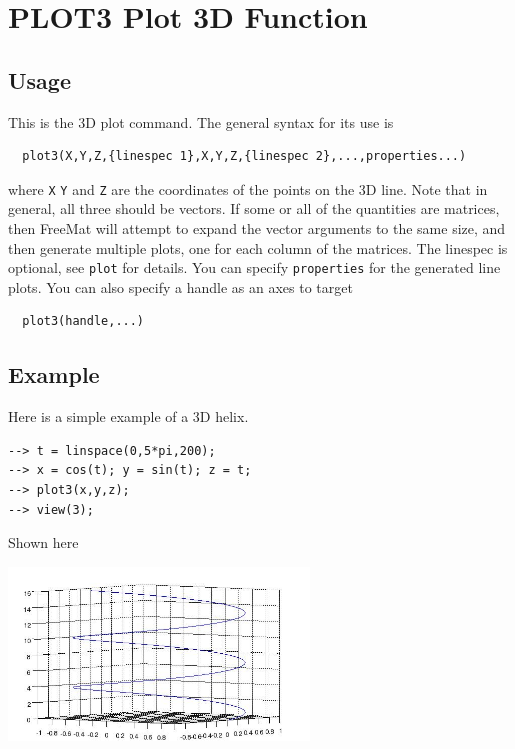 \section{PLOT3 Plot 3D Function}

\subsection{Usage}

This is the 3D plot command.  The general syntax for its use is
\begin{verbatim}
  plot3(X,Y,Z,{linespec 1},X,Y,Z,{linespec 2},...,properties...)
\end{verbatim}
where \verb|X| \verb|Y| and \verb|Z| are the coordinates of the points on the
3D line.  Note that in general, all three should be vectors.  If
some or all of the quantities are matrices, then FreeMat will attempt
to expand the vector arguments to the same size, and then generate
multiple plots, one for each column of the matrices.  The linespec
is optional, see \verb|plot| for details.  You can specify \verb|properties|
for the generated line plots.  You can also specify a handle as an
axes to target
\begin{verbatim}
  plot3(handle,...)
\end{verbatim}
\subsection{Example}

Here is a simple example of a 3D helix.
\begin{verbatim}
--> t = linspace(0,5*pi,200);
--> x = cos(t); y = sin(t); z = t;
--> plot3(x,y,z);
--> view(3);
\end{verbatim}
Shown here


\centerline{\includegraphics[width=8cm]{plt3}}

